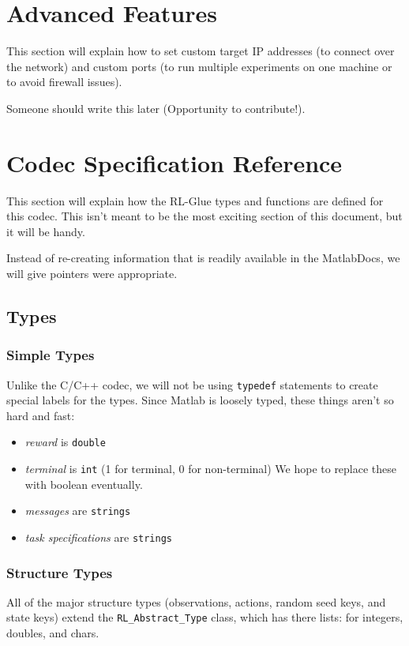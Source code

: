 \documentclass[11pt]{article}
\begin{document}
\section{Advanced Features}
This section will explain how to set custom target IP addresses (to connect over the network) and custom ports (to run multiple experiments on one machine or to avoid firewall issues).

Someone should write this later (Opportunity to contribute!).

\section{Codec Specification Reference}
This section will explain how the RL-Glue types and functions are defined for this codec.  This isn't meant to be the most exciting section of this document, but it will
be handy.

Instead of re-creating information that is readily available in the MatlabDocs, we will give pointers were appropriate.

\subsection{Types}


\subsubsection{Simple Types}
Unlike the C/C++ codec, we will not be using \texttt{typedef} statements to create special labels for the types. Since Matlab is loosely typed, these things aren't so hard and 
fast:
\begin{itemize}
	\item \textit{reward} is \texttt{double}
	\item \textit{terminal} is \texttt{int} (1 for terminal, 0 for non-terminal) We hope to replace these with boolean eventually.
	\item \textit{messages} are \texttt{strings}
	\item \textit{task specifications} are \texttt{strings}
\end{itemize}

\def\rat{RL\_Abstract\_Type}

\subsubsection{Structure Types}
\label{sec:structure-types}
All of the major structure types (observations, actions, random seed keys, and state keys) extend the \texttt{\rat} class, which has there lists: for integers, doubles, and chars.
\end{document}
